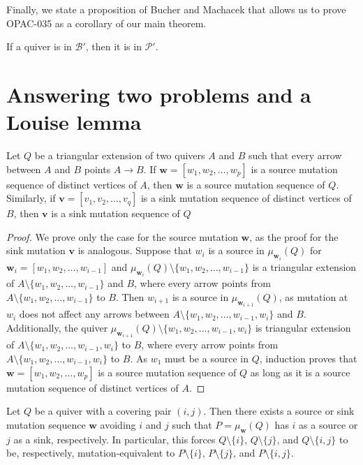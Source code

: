 \documentclass[ALCO,Unicode]{cedram}
\newcommand{\BB}{\mathcal{B}}
\newcommand{\PP}{\mathcal{P}}
\newcommand{\bw}{{\boldsymbol{w}}}
\newcommand{\bv}{{\boldsymbol{v}}}
\begin{document}
Finally, we state a proposition of Bucher and Machacek that allows us to prove OPAC-035 as a corollary of our main theorem.

\begin{prop}{\cite[Proposition 3.4]{MR4108215}} \label{prop-banff-p-containment}
    If a quiver is in $\BB'$, then it is in $\PP'$.
\end{prop}

\section{Answering two problems and a Louise lemma}\label{sec-proof}

\begin{lemm} \label{lem-triangular-extension-source-sink}
    Let $Q$ be a triangular extension of two quivers $A$ and $B$ such that every arrow between $A$ and $B$ points $A \to B$.
    If $\bw = [w_1, w_2, \dots, w_p]$ is a source mutation sequence of distinct vertices of $A$, then $\bw$ is a source mutation sequence of $Q$.
    Similarly, if $\bv = [v_1, v_2, \dots, v_q]$ is a sink mutation sequence of distinct vertices of $B$, then $\bv$ is a sink mutation sequence of $Q$
\end{lemm}

\begin{proof}
    We prove only the case for the source mutation $\bw$, as the proof for the sink mutation $\bv$ is analogous. 
    Suppose that $w_i$ is a source in $\mu_{\bw_i}(Q)$ for $\bw_i = [w_1, w_2, \dots, w_{i-1}]$ and $\mu_{\bw_i}(Q) \setminus \{w_1,w_2,\dots, w_{i-1}\}$ is a triangular extension of $A \setminus \{w_1,w_2,\dots, w_{i-1}\}$ and $B$, where every arrow points from $A \setminus \{w_1,w_2,\dots, w_{i-1}\}$ to $B$.
    Then $w_{i+1}$ is a source in $\mu_{\bw_{i+1}}(Q)$, as mutation at $w_i$ does not affect any arrows between $A \setminus \{w_1,w_2,\dots, w_{i-1}, w_i\}$ and $B$.
    Additionally, the quiver $\mu_{\bw_{i+1}}(Q) \setminus \{w_1,w_2,\dots, w_{i-1}, w_i\}$ is triangular extension of $A \setminus \{w_1,w_2,\dots, w_{i-1}, w_i\}$ to $B$, where every arrow points from $A \setminus \{w_1,w_2,\dots, w_{i-1}, w_i\}$ to $B$.
    As $w_1$ must be a source in $Q$, induction proves that $\bw = [w_1, w_2, \dots, w_p]$ is a source mutation sequence of $Q$ as long as it is a source mutation sequence of distinct vertices of $A$.
\end{proof}

\begin{lemm} \label{lem-covering-pair-mutation}
    Let $Q$ be a quiver with a covering pair $(i,j)$.
    Then there exists a source or sink mutation sequence $\bw$ avoiding $i$ and $j$ such that $P = \mu_\bw(Q)$ has $i$ as a source or $j$ as a sink, respectively.
    In particular, this forces $Q \setminus \{i\}$, $Q \setminus \{j\}$, and $Q \setminus \{i,j\}$ to be, respectively, mutation-equivalent to $P \setminus \{i\}$, $P \setminus \{j\}$, and $P \setminus \{i,j\}$.
\end{lemm}
\end{document}
